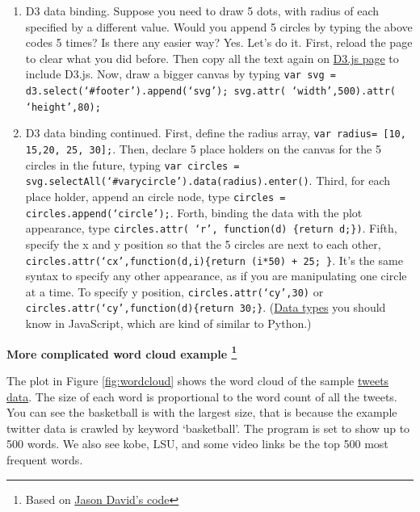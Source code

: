 \documentclass[a4paper, 11pt]{article}
\begin{document}
\begin{enumerate}
\item D3 data binding. Suppose you need to draw 5 dots, with radius of each specified by a different value. Would you append 5 circles by typing the above codes 5 times? Is there any easier way? Yes. Let's do it. First, reload the page to clear what you did before. Then copy all the text again on \href{https://raw.githubusercontent.com/mbostock/d3/master/d3.min.js}{D3.js page} to include D3.js. Now, draw a bigger canvas by typing \texttt{var svg = d3.select(`\#{footer}').append(`svg'); svg.attr( `width',500).attr( `height',80);} 
\item D3 data binding continued. First, define the radius array, \texttt{var radius= [10, 15,20, 25, 30];}. Then, declare 5 place holders on the canvas for the 5 circles in the future, typing \texttt{var circles = svg.selectAll(`\#{varycircle}').data(radius).enter()}. Third, for each place holder, append an circle node, type \texttt{circles = circles.append(`circle');}. Forth, binding the data with the plot appearance, type \texttt{circles.attr( `r', function(d) \{return d;\})}. Fifth, specify the x and y position so that the 5 circles are next to each other, \texttt{circles.attr(`cx',function(d,i)\{return (i*50) + 25; \}}. It's the same syntax to specify any other appearance, as if you are manipulating one circle at a time. To specify y position, \texttt{circles.attr(`cy',30)} or \texttt{circles.attr(`cy',function(d)\{return 30;\}}. (\href{http://alignedleft.com/tutorials/d3/data-types}{Data types} you should know in JavaScript, which are kind of similar to Python.)



\end{enumerate}
\textbf{More complicated word cloud example \protect \footnote{Based on \href{http://www.jasondavies.com/wordcloud}{Jason David's code}}}

The plot in Figure \ref{fig:wordcloud} shows the word cloud of the sample \href{http://nymph332088.github.io/CIS4340/labassignments/Lab2/twitter_data.txt}{tweets data}. The size of each word is proportional to the word count of all the tweets. You can see the basketball is with the largest size, that is because the example twitter data is crawled by keyword `basketball'. The program is set to show up to 500 words. We also see kobe, LSU, and some video links be the top 500 most frequent words. 
\end{document}
